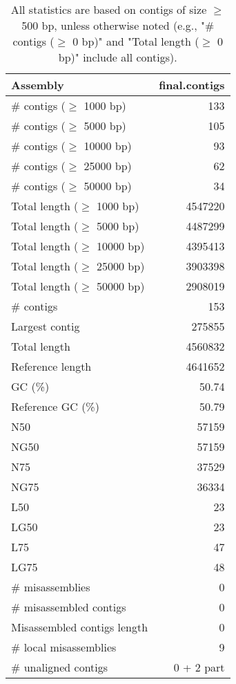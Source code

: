 \documentclass[12pt,a4paper]{article}
\begin{document}
\begin{table}[ht]
\begin{center}
\caption{All statistics are based on contigs of size $\geq$ 500 bp, unless otherwise noted (e.g., "\# contigs ($\geq$ 0 bp)" and "Total length ($\geq$ 0 bp)" include all contigs).}
\begin{tabular}{|l*{1}{|r}|}
\hline
Assembly & final.contigs \\ \hline
\# contigs ($\geq$ 1000 bp) & 133 \\ \hline
\# contigs ($\geq$ 5000 bp) & 105 \\ \hline
\# contigs ($\geq$ 10000 bp) & 93 \\ \hline
\# contigs ($\geq$ 25000 bp) & 62 \\ \hline
\# contigs ($\geq$ 50000 bp) & 34 \\ \hline
Total length ($\geq$ 1000 bp) & 4547220 \\ \hline
Total length ($\geq$ 5000 bp) & 4487299 \\ \hline
Total length ($\geq$ 10000 bp) & 4395413 \\ \hline
Total length ($\geq$ 25000 bp) & 3903398 \\ \hline
Total length ($\geq$ 50000 bp) & 2908019 \\ \hline
\# contigs & 153 \\ \hline
Largest contig & 275855 \\ \hline
Total length & 4560832 \\ \hline
Reference length & 4641652 \\ \hline
GC (\%) & 50.74 \\ \hline
Reference GC (\%) & 50.79 \\ \hline
N50 & 57159 \\ \hline
NG50 & 57159 \\ \hline
N75 & 37529 \\ \hline
NG75 & 36334 \\ \hline
L50 & 23 \\ \hline
LG50 & 23 \\ \hline
L75 & 47 \\ \hline
LG75 & 48 \\ \hline
\# misassemblies & 0 \\ \hline
\# misassembled contigs & 0 \\ \hline
Misassembled contigs length & 0 \\ \hline
\# local misassemblies & 9 \\ \hline
\# unaligned contigs & 0 + 2 part \\ \hline

\end{tabular}
\end{center}
\end{table}
\end{document}
